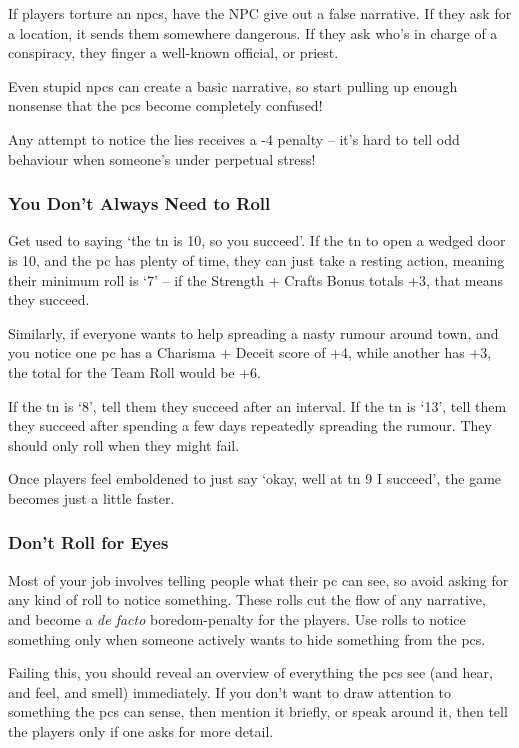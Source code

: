 \begin{multicols}{2}
If players torture an \glspl{npc}, have the NPC give out a false narrative.
If they ask for a location, it sends them somewhere dangerous.
If they ask who's in charge of a conspiracy, they finger a well-known official, or priest.

Even stupid \glspl{npc} can create a basic narrative, so start pulling up enough nonsense that the \glspl{pc} become completely confused!

Any attempt to notice the lies receives a -4 penalty -- it's hard to tell odd behaviour when someone's under perpetual stress!

\subsubsection{You Don't Always Need to Roll}

Get used to saying `the \gls{tn} is 10, so you succeed'.
If the \gls{tn} to open a wedged door is 10, and the \gls{pc} has plenty of time, they can just take a resting action, meaning their minimum roll is `7' -- if the Strength + Crafts Bonus totals +3, that means they succeed.

Similarly, if everyone wants to help spreading a nasty rumour around town, and you notice one \gls{pc} has a Charisma + Deceit score of +4, while another has +3, the total for the Team Roll would be +6.

If the \gls{tn} is `8', tell them they succeed after an interval.
If the \gls{tn} is `13', tell them they succeed after spending a few days repeatedly spreading the rumour.
They should only roll when they might fail.

Once players feel emboldened to just say `okay, well at \gls{tn} 9 I succeed', the game becomes just a little faster.

\subsubsection{Don't Roll for Eyes}

Most of your job involves telling people what their \gls{pc} can see, so avoid asking for any kind of roll to notice something.
These rolls cut the flow of any narrative, and become a \textit{de facto} boredom-penalty for the players.
Use rolls to notice something only when someone actively wants to hide something from the \glspl{pc}.

Failing this, you should reveal an overview of everything the \glspl{pc} see (and hear, and feel, and smell) immediately.
If you don't want to draw attention to something the \glspl{pc} can sense, then mention it briefly, or speak around it, then tell the players only if one asks for more detail.


\end{multicols}
